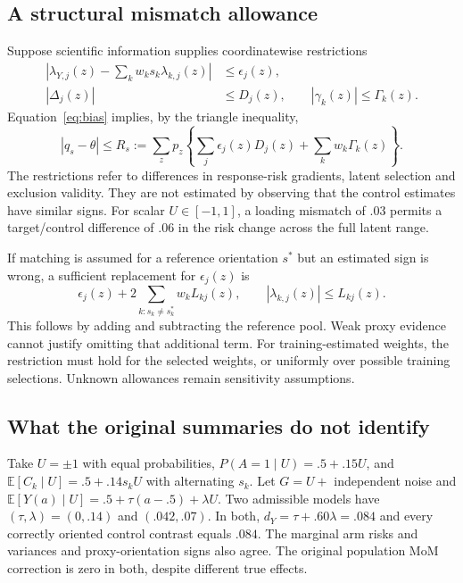 \documentclass[11pt,a4paper]{article}
\newcommand{\E}{\mathbb E}
\begin{document}
\subsection{A structural mismatch allowance}

Suppose scientific information supplies coordinatewise restrictions
\begin{align*}
 \left|\lambda_{Y,j}(z)-\sum_kw_ks_k\lambda_{k,j}(z)\right|&\le\epsilon_j(z),\\
 |\Delta_j(z)|&\le D_j(z),\qquad |\gamma_k(z)|\le\Gamma_k(z).
\end{align*}
Equation~\eqref{eq:bias} implies, by the triangle inequality,
\begin{equation}\label{eq:bound}
 |q_s-\theta|\le R_s:=\sum_zp_z\left\{\sum_j\epsilon_j(z)D_j(z)+\sum_kw_k\Gamma_k(z)\right\}.
\end{equation}
The restrictions refer to differences in response-risk gradients, latent selection and exclusion validity. They are not estimated by observing that the control estimates have similar signs. For scalar $U\in[-1,1]$, a loading mismatch of .03 permits a target/control difference of .06 in the risk change across the full latent range.

If matching is assumed for a reference orientation $s^*$ but an estimated sign is wrong, a sufficient replacement for $\epsilon_j(z)$ is
\[
 \epsilon_j(z)+2\sum_{k:s_k\ne s_k^*}w_kL_{kj}(z),
 \qquad |\lambda_{k,j}(z)|\le L_{kj}(z).
\]
This follows by adding and subtracting the reference pool. Weak proxy evidence cannot justify omitting that additional term. For training-estimated weights, the restriction must hold for the selected weights, or uniformly over possible training selections. Unknown allowances remain sensitivity assumptions.

\subsection{What the original summaries do not identify}

Take $U=\pm1$ with equal probabilities, $P(A=1\mid U)=.5+.15U$, and $\E[C_k\mid U]=.5+.14s_kU$ with alternating $s_k$. Let $G=U+$ independent noise and $\E[Y(a)\mid U]=.5+\tau(a-.5)+\lambda U$. Two admissible models have $(\tau,\lambda)=(0,.14)$ and $(.042,.07)$. In both, $d_Y=\tau+.60\lambda=.084$ and every correctly oriented control contrast equals $.084$. The marginal arm risks and variances and proxy-orientation signs also agree. The original population MoM correction is zero in both, despite different true effects.
\end{document}
